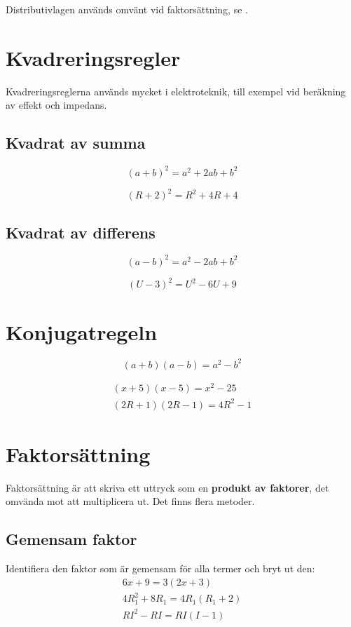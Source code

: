 Distributivlagen används omvänt vid faktorsättning, se .

\section{Kvadreringsregler}
\label{c2:sec:kvadrering}
Kvadreringsreglerna används mycket i elektroteknik, till exempel vid beräkning av effekt och
impedans.

\subsection{Kvadrat av summa}
\label{c2:sec:kvsumma}
\[
  (a + b)^2 = a^2 + 2ab + b^2
\]

\begin{exempel}
\[
  (R + 2)^2 = R^2 + 4R + 4
\]
\end{exempel}

\subsection{Kvadrat av differens}
\label{c2:sec:kvdiff}
\[
  (a - b)^2 = a^2 - 2ab + b^2
\]

\begin{exempel}
\[
  (U - 3)^2 = U^2 - 6U + 9
\]
\end{exempel}

\section{Konjugatregeln}
\label{c2:sec:konjugat}
\[
  (a + b)(a - b) = a^2 - b^2
\]

\begin{exempel}
\begin{gather*}
  (x + 5)(x - 5) = x^2 - 25 \\
  (2R + 1)(2R - 1) = 4R^2 - 1
\end{gather*}
\end{exempel}

\section{Faktorsättning}
\label{c2:sec:faktorsattning}
Faktorsättning är att skriva ett uttryck som en \textbf{produkt av faktorer}, det omvända mot att
multiplicera ut. Det finns flera metoder.

\subsection{Gemensam faktor}
\label{c2:sec:gemensam}
Identifiera den faktor som är gemensam för alla termer och bryt ut den:
\begin{gather*}
  6x + 9 = 3(2x + 3) \\
  4R_1^2 + 8R_1 = 4R_1(R_1 + 2) \\
  RI^2 - RI = RI(I - 1)
\end{gather*}

